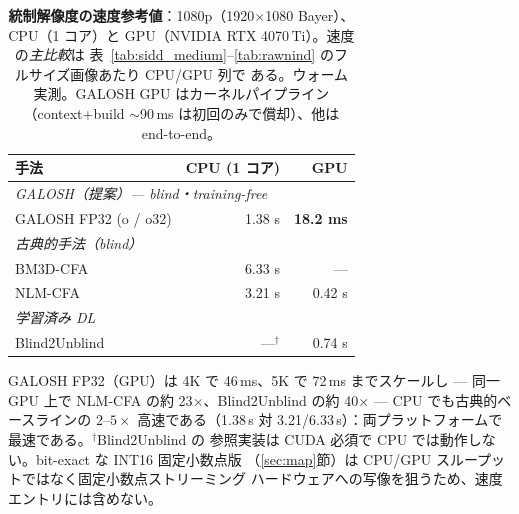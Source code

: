 \begin{table}[t]
\centering
\caption{\textbf{統制解像度の速度参考値}：1080p（1920$\times$1080 Bayer）、
CPU（1 コア）と GPU（NVIDIA RTX 4070\,Ti）。速度の\emph{主比較}は
表~\ref{tab:sidd_medium}--\ref{tab:rawnind} のフルサイズ画像あたり CPU/GPU 列で
ある。ウォーム実測。GALOSH GPU はカーネルパイプライン（context+build
$\sim$90\,ms は初回のみで償却）、他は end-to-end。}
\label{tab:speed}
\setlength{\tabcolsep}{8pt}
\begin{tabular}{l rr}
\toprule
手法 & CPU (1 コア) & GPU\\
\midrule
\multicolumn{3}{l}{\textit{GALOSH（提案）--- blind・training-free}}\\
\quad GALOSH FP32 (o / o32)        & 1.38 s & \textbf{18.2 ms}\\
\midrule
\multicolumn{3}{l}{\textit{古典的手法（blind）}}\\
\quad BM3D-CFA                     & 6.33 s & ---\\
\quad NLM-CFA                      & 3.21 s & 0.42 s\\
\midrule
\multicolumn{3}{l}{\textit{学習済み DL}}\\
\quad Blind2Unblind                & ---$^{\dagger}$ & 0.74 s\\
\bottomrule
\end{tabular}

\vspace{2pt}
{\footnotesize GALOSH FP32（GPU）は 4K で 46\,ms、5K で 72\,ms までスケールし
--- 同一 GPU 上で NLM-CFA の約 23$\times$、Blind2Unblind の約 40$\times$ ---
CPU でも古典的ベースラインの $2$--$5\times$ 高速である（1.38\,s 対
3.21/6.33\,s）：両プラットフォームで最速である。$^{\dagger}$Blind2Unblind の
参照実装は CUDA 必須で CPU では動作しない。bit-exact な INT16 固定小数点版
（\ref{sec:map}節）は CPU/GPU スループットではなく固定小数点ストリーミング
ハードウェアへの写像を狙うため、速度エントリには含めない。}
\end{table}
